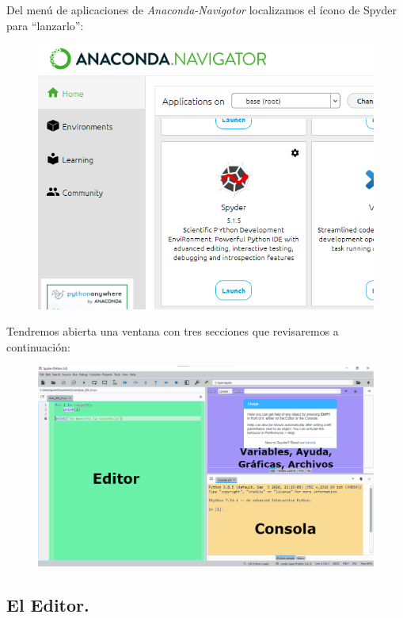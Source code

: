 Del menú de aplicaciones de \textit{Anaconda-Navigotor} localizamos el ícono de Spyder para \enquote{lanzarlo}:
\begin{figure}[H]
    \centering
    \includegraphics[scale=0.5]{Imagenes/Guia_IDE_09.png}
\end{figure}
Tendremos abierta una ventana con tres secciones que revisaremos a continuación:
\begin{figure}[H]
    \centering
    \includegraphics[scale=0.4]{Imagenes/Guia_IDE_10.png}
\end{figure}

\subsection{El Editor.}

